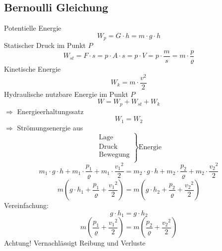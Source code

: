 \documentclass[a4,paper,fleqn]{article}
\begin{document}
\subsection{Bernoulli Gleichung}
Potentielle Energie
\[ W_p = G \cdot h = m \cdot g \cdot h \]
Statischer Druck im Punkt $P$
\[ W_{st} = F \cdot s = p \cdot A \cdot s = p \cdot V = 
p \cdot \frac{m}{s} = m \cdot \frac{p}{\varrho} \]
Kinetische Energie
\[ W_k = m \cdot \frac{v^2}{2} \]
Hydraulische nutzbare Energie im Punkt $P$
\[ W = W_p + W_{st} + W_k \]
$\Rightarrow$ Energieerhaltungssatz
\[ W_1 = W_2 \]
$\Rightarrow$ Strömungsenergie aus
\[ 
    \left.
    \begin{array}{l}
        \text{Lage} \\
        \text{Druck} \\
        \text{Bewegung} \\
    \end{array}
    \right\rbrace \text{Energie}
\]
\[ 
m_1 \cdot g \cdot h + 
m_1 \cdot \frac{p_1}{\varrho} + 
m_1 \cdot \frac{{v_1}^2}{2} = 
m_2 \cdot g \cdot h + 
m_2 \cdot \frac{p_2}{\varrho} + 
m_2 \cdot \frac{{v_2}^2}{2} \]
\[ \boxed{
    m \left(g \cdot h_1 + \frac{p_1}{\varrho} + \frac{{v_1}^2}{2}\right) =
    m \left(g \cdot h_2 + \frac{p_2}{\varrho} + \frac{{v_2}^2}{2}\right)} \]
Vereinfachung: 
\[ g \cdot h_1 = g \cdot h_2 \]
\[ m \left(\frac{p_1}{\varrho} + \frac{{v_1}^2}{2}\right) =
   m \left(\frac{p_2}{\varrho} + \frac{{v_2}^2}{2}\right) \]
Achtung! Vernachlässigt Reibung und Verluste
\end{document}
